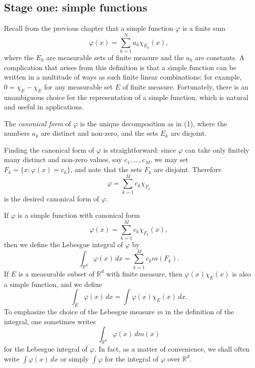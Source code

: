 \documentclass[11pt,openany]{book}
\begin{document}
\subsection*{Stage one: simple functions}

Recall from the previous chapter that a simple function $\varphi$ is a finite sum
\begin{equation}
\varphi(x)=\sum_{k=1}^{N} a_k\chi_{E_k}(x),
\tag{1}
\end{equation}
where the $E_k$ are measurable sets of finite measure and the $a_k$ are constants. A complication that arises from this definition is that a simple function can be written in a multitude of ways as such finite linear combinations; for example, $0=\chi_E-\chi_E$ for any measurable set $E$ of finite measure. Fortunately, there is an unambiguous choice for the representation of a simple function, which is natural and useful in applications.

The \emph{canonical form} of $\varphi$ is the unique decomposition as in (1), where the numbers $a_k$ are distinct and non-zero, and the sets $E_k$ are disjoint.

Finding the canonical form of $\varphi$ is straightforward: since $\varphi$ can take only finitely many distinct and non-zero values, say $c_1,\ldots,c_M$, we may set $F_k=\{x:\varphi(x)=c_k\}$, and note that the sets $F_k$ are disjoint. Therefore
\[
\varphi=\sum_{k=1}^{M}c_k\chi_{F_k}
\]
is the desired canonical form of $\varphi$.

If $\varphi$ is a simple function with canonical form
\[
\varphi(x)=\sum_{k=1}^{M}c_k\chi_{F_k}(x),
\]
then we define the Lebesgue integral of $\varphi$ by
\[
\int_{\mathbb{R}^d}\varphi(x)\,dx
=\sum_{k=1}^{M}c_km(F_k).
\]
If $E$ is a measurable subset of $\mathbb{R}^d$ with finite measure, then $\varphi(x)\chi_E(x)$ is also a simple function, and we define
\[
\int_E\varphi(x)\,dx
=\int \varphi(x)\chi_E(x)\,dx.
\]
To emphasize the choice of the Lebesgue measure $m$ in the definition of the integral, one sometimes writes
\[
\int_{\mathbb{R}^d}\varphi(x)\,dm(x)
\]
for the Lebesgue integral of $\varphi$. In fact, as a matter of convenience, we shall often write $\int\varphi(x)\,dx$ or simply $\int\varphi$ for the integral of $\varphi$ over $\mathbb{R}^d$.
\end{document}
